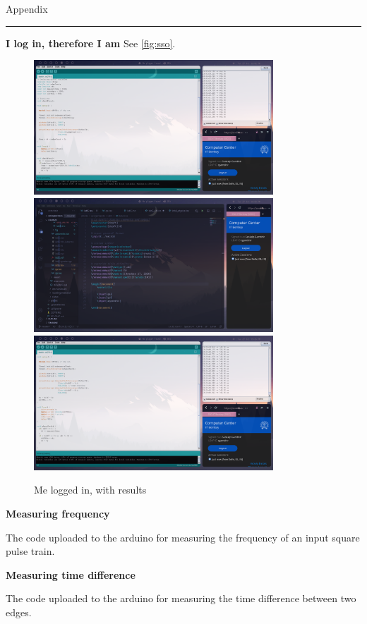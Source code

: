 \newpage
{\large Appendix}
\hrule
\label{appendix}

\textbf{I log in, therefore I am}
\label{appendix:proof}
See \autoref{fig:sso}.
\begin{figure}[ht]
    \centering
    \includegraphics[width=0.8\textwidth]{fig/me.png}
    \includegraphics[width=0.8\textwidth]{fig/me2.png}
    \includegraphics[width=0.8\textwidth]{fig/me3.png}
    \caption{Me logged in, with results}
    \label{fig:sso}
\end{figure}
\textbf{Measuring frequency}
\label{appendix:arduino}

The code uploaded to the arduino for measuring the frequency of an input square
pulse train.



\textbf{Measuring time difference}
\label{appendix:diff}

The code uploaded to the arduino for measuring the time difference between two
edges.



